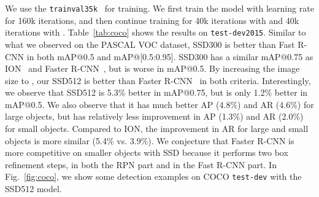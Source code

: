 \documentclass[runningheads]{llncs}
\begin{document}
We use the \texttt{trainval35k}~\cite{bell2015inside} for training. We first train the model with  learning rate for 160k iterations, and then continue training for 40k iterations with  and 40k iterations with . Table~\ref{tab:coco} shows the results on \texttt{test-dev2015}. Similar to what we observed on the PASCAL VOC dataset, SSD300 is better than Fast R-CNN in both mAP@0.5 and mAP@[0.5:0.95]. SSD300 has a similar mAP@0.75 as ION~\cite{bell2015inside} and Faster R-CNN~\cite{cocoleaderboard}, but is worse in mAP@0.5.
By increasing the image size to , our SSD512 is better than Faster R-CNN~\cite{cocoleaderboard} in both criteria. Interestingly, we observe that SSD512 is 5.3\% better in mAP@0.75, but is only 1.2\% better in mAP@0.5. We also observe that it has much better AP (4.8\%) and AR (4.6\%) for large objects, but has relatively less improvement in AP (1.3\%) and AR (2.0\%) for small objects. Compared to ION, the improvement in AR for large and small objects is more similar (5.4\% vs. 3.9\%). We conjecture that Faster R-CNN is more competitive on smaller objects with SSD because it performs two box refinement steps, in both the RPN part and in the Fast R-CNN part. In Fig.~\ref{fig:coco}, we show some detection examples on COCO \texttt{test-dev} with the SSD512 model.
\end{document}
